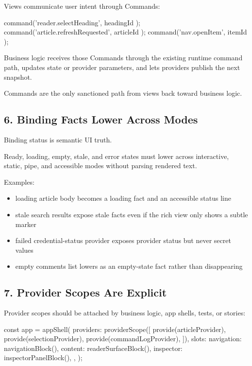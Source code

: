 Views communicate user intent through Commands:

\begin{CodeBlock}
command('reader.selectHeading', { headingId });
command('article.refreshRequested', { articleId });
command('nav.openItem', { itemId });
\end{CodeBlock}

Business logic receives those Commands through the existing runtime command path, updates state or provider parameters, and lets providers publish the next snapshot.

Commands are the only sanctioned path from views back toward business logic.

\subsection{6. Binding Facts Lower Across Modes}\label{record-132-binding-facts-lower-across-modes}

Binding status is semantic UI truth.

Ready, loading, empty, stale, and error states must lower across interactive, static, pipe, and accessible modes without parsing rendered text.

Examples:

\begin{itemize}
\tightlist
\item
  loading article body becomes a loading fact and an accessible status line
\item
  stale search results expose stale facts even if the rich view only shows a subtle marker
\item
  failed credential-status provider exposes provider status but never secret values
\item
  empty comments list lowers as an empty-state fact rather than disappearing
\end{itemize}

\subsection{7. Provider Scopes Are Explicit}\label{record-132-provider-scopes-are-explicit}

Provider scopes should be attached by business logic, app shells, tests, or stories:

\begin{CodeBlock}
const app = appShell({
  providers: providerScope([
    provide(articleProvider),
    provide(selectionProvider),
    provide(commandLogProvider),
  ]),
  slots: {
    navigation: navigationBlock(),
    content: readerSurfaceBlock(),
    inspector: inspectorPanelBlock(),
  },
});
\end{CodeBlock}

